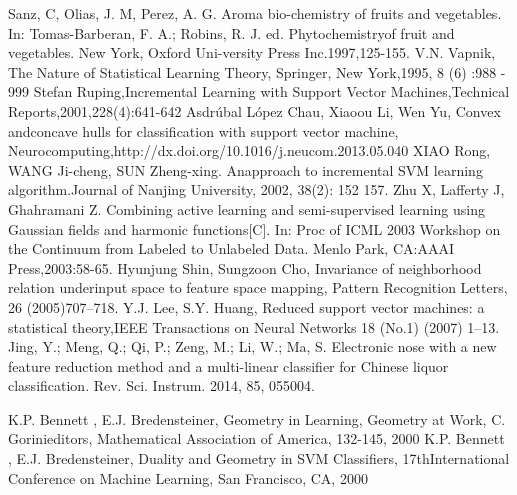 \documentclass[a4paper]{article}
\begin{document}
\renewcommand\refname{References}
\begin{thebibliography}{12}
    Sanz, C, Olias,  J.  M,  Perez,  A.  G. Aroma  bio-chemistry  of  fruits  and  vegetables.  In:  Tomas-Barberan,  F. A.; Robins, R. J. ed. Phytochemistryof  fruit  and  vegetables.  New  York,  Oxford  Uni-versity  Press  Inc.1997,125-155.
    V.N. Vapnik, The Nature of Statistical Learning Theory, Springer, New York,1995, 8 (6) :988 - 999
    Stefan Ruping,Incremental Learning with Support Vector Machines,Technical Reports,2001,228(4):641-642
    Asdrúbal López Chau, Xiaoou Li, Wen Yu, Convex andconcave hulls for classification with support vector machine, Neurocomputing,http://dx.doi.org/10.1016/j.neucom.2013.05.040
    XIAO Rong, WANG Ji-cheng, SUN Zheng-xing. Anapproach to incremental SVM learning algorithm.Journal of Nanjing University, 2002, 38(2): 152 157.
    Zhu X, Lafferty J, Ghahramani Z. Combining active learning and semi-supervised learning using Gaussian fields  and  harmonic  functions[C].  In:  Proc  of  ICML  2003  Workshop  on  the  Continuum  from  Labeled  to Unlabeled Data. Menlo Park, CA:AAAI Press,2003:58-65.
    Hyunjung Shin, Sungzoon Cho, Invariance of neighborhood relation underinput space to feature space mapping, Pattern Recognition Letters, 26 (2005)707–718.
    Y.J. Lee, S.Y. Huang, Reduced support vector machines: a statistical theory,IEEE Transactions on Neural Networks 18 (No.1) (2007) 1–13.
    Jing, Y.; Meng, Q.; Qi, P.; Zeng, M.; Li, W.; Ma, S. Electronic nose with a new feature reduction method and a multi-linear classifier for Chinese liquor classification. Rev. Sci. Instrum. 2014, 85, 055004. 

    K.P. Bennett , E.J. Bredensteiner, Geometry in Learning, Geometry at Work, C. Gorinieditors, Mathematical Association of America, 132-145, 2000
    K.P. Bennett , E.J. Bredensteiner, Duality and Geometry in SVM Classiﬁers, 17thInternational Conference on Machine Learning, San Francisco, CA, 2000
\end{thebibliography}
\end{document}
